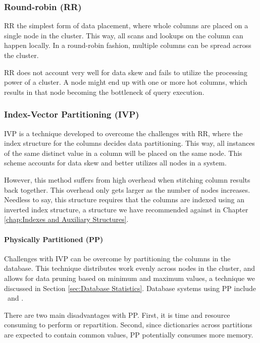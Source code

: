 \subsubsection{Round-robin (RR)}
\label{ssub:Round-robin (RR)}
RR the simplest form of data placement, where whole columns are placed on a single node in the cluster. This way, all scans and lookups on the column can happen locally. In a round-robin fashion, multiple columns can be spread across the cluster.

RR does not account very well for data skew and fails to utilize the processing power of a cluster. A node might end up with one or more hot columns, which results in that node becoming the bottleneck of query execution.

\subsubsection{Index-Vector Partitioning (IVP)}
\label{ssub:Index-Vector Partitioning (IVP)}
IVP is a technique developed to overcome the challenges with RR, where the index structure for the columns decides data partitioning. This way, all instances of the same distinct value in a column will be placed on the same node. This scheme accounts for data skew and better utilizes all nodes in a system.

However, this method suffers from high overhead when stitching column results back together. This overhead only gets larger as the number of nodes increases. Needless to say, this structure requires that the columns are indexed using an inverted index structure, a structure we have recommended against in Chapter \ref{chap:Indexes and Auxiliary Structures}.

\paragraph{Physically Partitioned (PP)}
\label{par:Physically Partitioned (PP)}
Challenges with IVP can be overcome by partitioning the columns in the database. This technique distributes work evenly across nodes in the cluster, and allows for data pruning based on minimum and maximum values, a technique we discussed in Section \ref{sec:Database Statistics}. Database systems using PP include \oracle~and \saph.

There are two main disadvantages with PP. First, it is time and resource consuming to perform or repartition. Second, since dictionaries across partitions are expected to contain common values, PP potentially consumes more memory.

